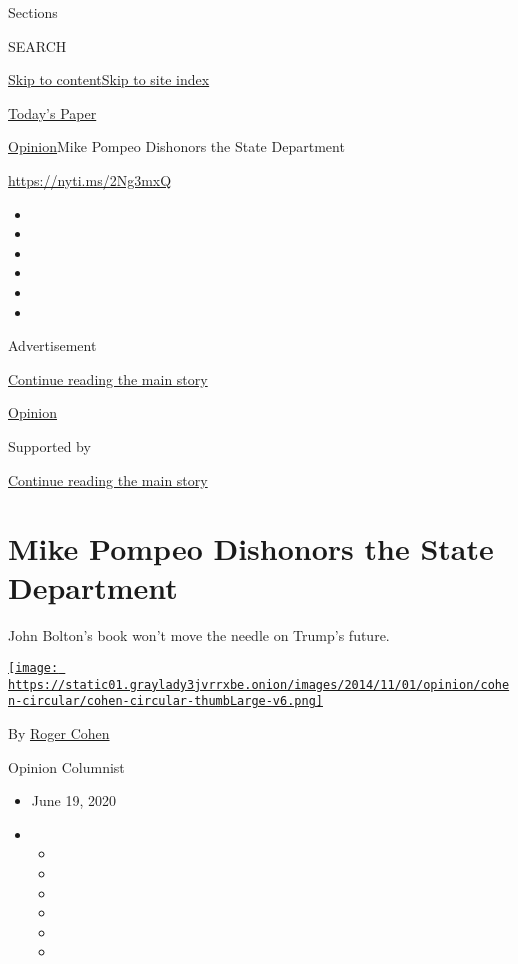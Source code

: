Sections

SEARCH

\protect\hyperlink{site-content}{Skip to
content}\protect\hyperlink{site-index}{Skip to site index}

\href{https://myaccount.nytimes3xbfgragh.onion/auth/login?response_type=cookie\&client_id=vi}{}

\href{https://www.nytimes3xbfgragh.onion/section/todayspaper}{Today's
Paper}

\href{/section/opinion}{Opinion}\textbar{}Mike Pompeo Dishonors the
State Department

\url{https://nyti.ms/2Ng3mxQ}

\begin{itemize}
\item
\item
\item
\item
\item
\item
\end{itemize}

Advertisement

\protect\hyperlink{after-top}{Continue reading the main story}

\href{/section/opinion}{Opinion}

Supported by

\protect\hyperlink{after-sponsor}{Continue reading the main story}

\hypertarget{mike-pompeo-dishonors-the-state-department}{%
\section{Mike Pompeo Dishonors the State
Department}\label{mike-pompeo-dishonors-the-state-department}}

John Bolton's book won't move the needle on Trump's future.

\href{https://www.nytimes3xbfgragh.onion/by/roger-cohen}{\texttt{[image: https://static01.graylady3jvrrxbe.onion/images/2014/11/01/opinion/cohen-circular/cohen-circular-thumbLarge-v6.png]}}

By \href{https://www.nytimes3xbfgragh.onion/by/roger-cohen}{Roger Cohen}

Opinion Columnist

\begin{itemize}
\item
  June 19, 2020
\item
  \begin{itemize}
  \item
  \item
  \item
  \item
  \item
  \item
  \end{itemize}
\end{itemize}

